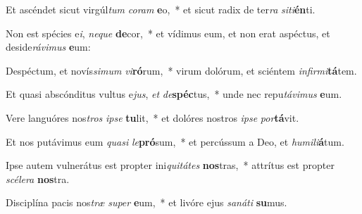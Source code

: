 \item Et ascéndet sicut virgúl\textit{tum} \textit{co}\textit{ram} \textbf{e}o,~* et sicut radix de ter\textit{ra} \textit{si}\textit{ti}\textbf{én}ti.
\item Non est spécies e\textit{i}, \textit{ne}\textit{que} \textbf{de}cor,~* et vídimus eum, et non erat aspéctus, et deside\textit{rá}\textit{vi}\textit{mus} \textbf{e}um:
\item Despéctum, et novís\textit{si}\textit{mum} \textit{vi}\textbf{ró}rum,~* virum dolórum, et sciéntem \textit{in}\textit{fir}\textit{mi}\textbf{tá}tem.
\item Et quasi abscónditus vultus e\textit{jus}, \textit{et} \textit{de}\textbf{spéc}tus,~* unde nec repu\textit{tá}\textit{vi}\textit{mus} \textbf{e}um.
\item Vere languóres nos\textit{tros} \textit{ip}\textit{se} \textbf{tu}lit,~* et dolóres nostros \textit{ip}\textit{se} \textit{por}\textbf{tá}vit.
\item Et nos putávimus eum \textit{qua}\textit{si} \textit{le}\textbf{pró}sum,~* et percússum a Deo, et \textit{hu}\textit{mi}\textit{li}\textbf{á}tum.
\item Ipse autem vulnerátus est propter ini\textit{qui}\textit{tá}\textit{tes} \textbf{nos}tras,~* attrítus est propter \textit{scé}\textit{le}\textit{ra} \textbf{nos}tra.
\item Disciplína pacis nos\textit{træ} \textit{su}\textit{per} \textbf{e}um,~* et livóre ejus \textit{sa}\textit{ná}\textit{ti} \textbf{su}mus.
